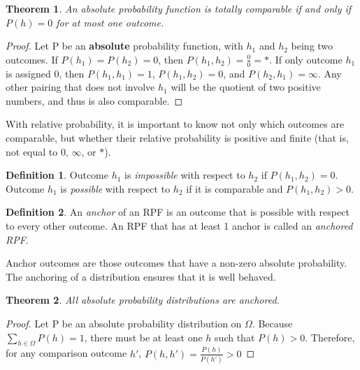 \documentclass[twoside]{article}
\theoremstyle{plain}%
\newtheorem{theorem}{Theorem}[section]
\theoremstyle{definition}
\newtheorem{definition}{Definition}[section]
\theoremstyle{remark}
\begin{document}
\begin{theorem}
\label{thm:abs_totally_comparable}
An absolute probability function is totally comparable if and only if \(P(h) = 0\) for at most one outcome.
\end{theorem}

\begin{proof}
Let P be an \textbf{absolute} probability function, with \(h_1\) and \(h_2\) being two outcomes. If \(P(h_1) = P(h_2) = 0\), then \(P(h_1, h_2) = \frac{0}{0} = \ast\). If only outcome \(h_1\) is assigned 0, then \(P(h_1, h_1) = 1\), \(P(h_1, h_2) = 0\), and \(P(h_2, h_1) = \infty\). Any other pairing that does not involve \(h_1\) will be the quotient of two positive numbers, and thus is also comparable.
\end{proof}

With relative probability, it is important to know not only which outcomes are comparable, but whether their relative probability is positive and finite (that is, not equal to 0, \(\infty\), or \(\ast\)).

\begin{definition}
Outcome \(h_1\) is \textit{impossible} with respect to \(h_2\) if \(P(h_1, h_2) = 0\). Outcome \(h_1\) is \textit{possible} with respect to \(h_2\) if it is comparable and \(P(h_1, h_2) > 0\).
\end{definition}

\begin{definition}
\label{def:anchored_rpf}
An \textit{anchor} of an RPF is an outcome that is possible with respect to every other outcome. An RPF that has at least 1 anchor is called an \textit{anchored RPF}.
\end{definition}

Anchor outcomes are those outcomes that have a non-zero absolute probability. The anchoring of a distribution ensures that it is well behaved.

\begin{theorem}
\label{thm:absolute_anchored}
All absolute probability distributions are anchored.
\end{theorem}

\begin{proof}
Let P be an absolute probability distribution on \(\Omega\). Because \(\sum_{h \in \Omega} P(h) = 1\), there must be at least one \(h\) such that \(P(h) > 0\).  Therefore, for any comparison outcome \(h'\), \(P(h, h') = \frac{P(h)}{P(h')} > 0\)
\end{proof}
\end{document}
